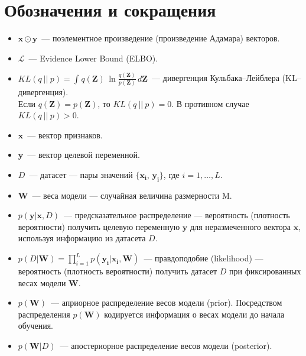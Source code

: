 \documentclass{article}
\numberwithin{equation}{section}
\begin{document}
    \section{Обозначения и сокращения}
    \begin{itemize}
        \item $\pmb{x} \odot \pmb{y}$~--- поэлементное произведение (произведение Адамара) векторов.
        \item $\mathcal{L}$~--- Evidence Lower Bound (ELBO).
        \item $
                KL(q~||~p)
                =
                \int_{}{
                    q(\pmb{Z})
                    \,
                    \ln{
                        \frac
                            {q(\pmb{Z})}
                            {p(\pmb{Z})}
                    }
                    \,
                    d\pmb{Z}
                }
            $~--- дивергенция Кульбака--Лейблера (KL--дивергенция). \\
            Если $q(\pmb{Z}) = p(\pmb{Z})$, то $KL(q~||~p) = 0$.
            В противном случае $KL(q~||~p) > 0$.
        \item $\pmb{x}$~--- вектор признаков.
        \item $\pmb{y}$~--- вектор целевой переменной.
        \item $D$~--- датасет --- пары значений $\{\pmb{x_i}$, $\pmb{y_i}\}$, где $i = 1, \dots, L$.
        \item $\pmb{W}$~--- веса модели --- случайная величина размерности M.
        \item $p(\pmb{y} | \pmb{x}, D)$~--- предсказательное распределение
            --- вероятность (плотность вероятности) получить целевую переменную $\pmb{y}$
            для неразмеченного вектора $\pmb{x}$, используя информацию из датасета $D$.
        \item $
                p(D | \pmb{W})
                =
                \prod_{i=1}^{L}{
                    p(\pmb{y_i} | \pmb{x_i}, \pmb{W})
                }
              $~--- правдоподобие (likelihood)
              --- вероятность (плотность вероятности) получить датасет $D$
              при фиксированных весах модели $\pmb{W}$.
        \item $p(\pmb{W})$~--- априорное распределение весов модели (prior).
            Посредством распределения $p(\pmb{W})$ кодируется информация о весах модели
            до начала обучения.
        \item $p(\pmb{W}| D)$~--- апостериорное распределение весов модели (posterior).

\end{itemize}
\end{document}

